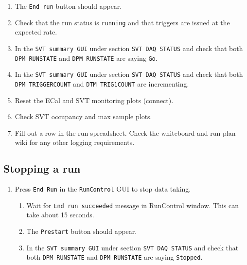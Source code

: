 \documentclass[12pt]{article}
\begin{document}
\begin{enumerate}
\begin{enumerate}
\item
The \texttt{End run} button should appear.

\item
Check that the run status is \texttt{running} and that triggers are issued at the expected rate.


\item
In the \texttt{SVT summary GUI} under section \texttt{SVT DAQ STATUS} and check that both \texttt{DPM RUNSTATE}  and \texttt{DPM RUNSTATE}  are saying \texttt{Go}.

\item
In the \texttt{SVT summary GUI} under section \texttt{SVT DAQ STATUS} and check that both \texttt{DPM TRIGGERCOUNT} and   \texttt{DTM TRIG1COUNT}  are incrementing.


\item
Reset the ECal and SVT monitoring plots (connect). 

\item
Check SVT occupancy and max sample plots.

\item
Fill out a row in the run spreadsheet. Check the whiteboard and run plan wiki for any other logging requirements.

\end{enumerate}
\end{enumerate}

\subsection{Stopping a run}

\begin{enumerate}

\item
\label{item:stop}
Press \texttt{End Run} in the \texttt{RunControl}  GUI to stop data taking.

\begin{enumerate}

\item
Wait for \texttt{End run succeeded} message in RunControl window. \newline
This can take about 15 seconds.

\item
The \texttt{Prestart} button should appear.

\item
In the \texttt{SVT summary GUI} under section \texttt{SVT DAQ STATUS} and check that both \texttt{DPM RUNSTATE}  and \texttt{DPM RUNSTATE}  are saying \texttt{Stopped}.


\end{enumerate}
\end{enumerate}
\end{document}

